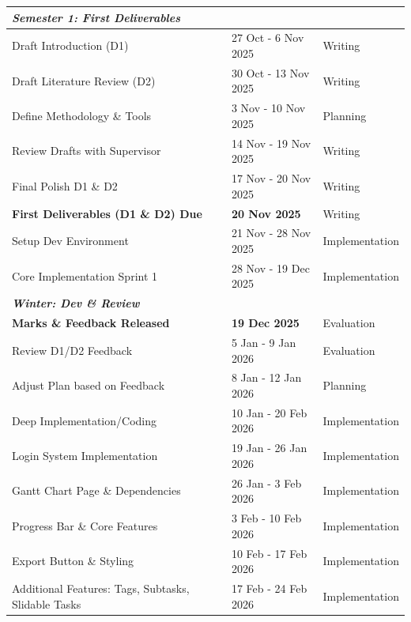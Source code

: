 \documentclass[12pt,nonacm,acmlarge,titlepage,screen]{acmart}
\begin{document}
\begin{table}[htbp]
\begin{tabularx}{\textwidth}{| X | l | l |}
        \multicolumn{3}{|l|}{\textit{\textbf{Semester 1: First Deliverables}}} \\
        \hline
        Draft Introduction (D1) & 27 Oct - 6 Nov 2025 & Writing \\
        \hline
        Draft Literature Review (D2) & 30 Oct - 13 Nov 2025 & Writing \\
        \hline
        Define Methodology \& Tools & 3 Nov - 10 Nov 2025 & Planning \\
        \hline
        Review Drafts with Supervisor & 14 Nov - 19 Nov 2025 & Writing \\
        \hline
        Final Polish D1 \& D2 & 17 Nov - 20 Nov 2025 & Writing \\
        \hline
        \textbf{First Deliverables (D1 \& D2) Due} & \textbf{20 Nov 2025} & Writing \\
        \hline
        Setup Dev Environment & 21 Nov - 28 Nov 2025 & Implementation \\
        \hline
        Core Implementation Sprint 1 & 28 Nov - 19 Dec 2025 & Implementation \\
        \hline
        
        \multicolumn{3}{|l|}{\textit{\textbf{Winter: Dev \& Review}}} \\
        \hline
        \textbf{Marks \& Feedback Released} & \textbf{19 Dec 2025} & Evaluation \\
        \hline
        Review D1/D2 Feedback & 5 Jan - 9 Jan 2026 & Evaluation \\
        \hline
        Adjust Plan based on Feedback & 8 Jan - 12 Jan 2026 & Planning \\
        \hline
        Deep Implementation/Coding & 10 Jan - 20 Feb 2026 & Implementation \\
        \hline
        Login System Implementation & 19 Jan - 26 Jan 2026 & Implementation \\
        \hline
        Gantt Chart Page \& Dependencies & 26 Jan - 3 Feb 2026 & Implementation \\
        \hline
        Progress Bar \& Core Features & 3 Feb - 10 Feb 2026 & Implementation \\
        \hline
        Export Button \& Styling & 10 Feb - 17 Feb 2026 & Implementation \\
        \hline
        Additional Features: Tags, Subtasks, Slidable Tasks & 17 Feb - 24 Feb 2026 & Implementation \\
        \hline
        

\end{tabularx}
\end{table}
\end{document}
